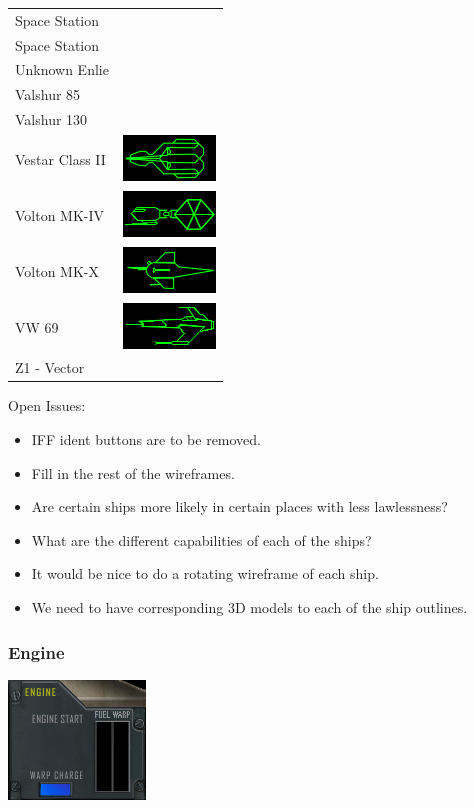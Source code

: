 \begin{tabular}{ | l | l | }
Space Station & \\
Space Station & \\
Unknown Enlie & \\
Valshur 85 & \\
Valshur 130 & \\
Vestar Class II & \includegraphics[scale=0.75]{images/ship_vestar_class_2.png} \\
Volton MK-IV & \includegraphics[scale=0.75]{images/ship_Voton_MK_IV.png} \\
Volton MK-X & \includegraphics[scale=0.75]{images/ship_Voton_MK_X.png} \\
VW 69 & \includegraphics[scale=0.75]{images/ship_VW-69.png} \\
Z1 - Vector & \\
\hline
\end{tabular}

Open Issues:
\begin{itemize}
\item IFF ident buttons are to be removed.
\item Fill in the rest of the wireframes.
\item Are certain ships more likely in certain places with less lawlessness?
\item What are the different capabilities of each of the ships?
\item It would be nice to do a rotating wireframe of each ship.
\item We need to have corresponding 3D models to each of the ship outlines.
\end{itemize}

\subsubsection{Engine}
\includegraphics[scale=0.70]{images/engine.png}

